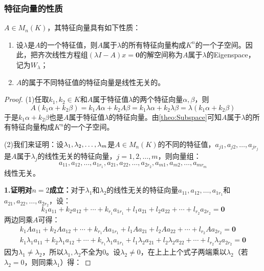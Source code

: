 \subsubsection{特征向量的性质}
\begin{property}\label{prop:Eigenvector}
	$A\in M_{n}(K)$，其特征向量具有如下性质：
	\begin{enumerate}
		\item 设$\lambda$是$A$的一个特征值，则$A$属于$\lambda$的所有特征向量构成$K^n$的一个子空间。因此，把齐次线性方程组$(\lambda I-A)x=\mathbf{0}$的解空间称为$A$属于$\lambda$的\gls{Eigenspace}，记为$W_{\lambda}$；
		\item $A$的属于不同特征值的特征向量是线性无关的。
	\end{enumerate}
\end{property}
\begin{proof}
	(1)任取$k_1,k_2\in K$和$A$属于特征值$\lambda$的两个特征向量$\alpha,\beta$，则
	\begin{equation*}
		A(k_1\alpha+k_2\beta)=k_1A\alpha+k_2A\beta=k_1\lambda\alpha+k_2\lambda\beta=\lambda(k_1\alpha+k_2\beta)
	\end{equation*}
	于是$k_1\alpha+k_2\beta$也是$A$属于特征值$\lambda$的特征向量。由\cref{theo:Subspace}可知$A$属于$\lambda$的所有特征向量构成$K^n$的一个子空间。\par
	(2)我们来证明：设$\lambda_1, \lambda_2, \dots, \lambda_{m}$是$A\in M_{n}(K)$的不同的特征值，$a_{j1},a_{j2},\dots,a_{jr_j}$是$A$属于$\lambda_j$的线性无关的特征向量，$j=1,2,\dots,m$，则向量组：
	\begin{equation*}
		a_{11},a_{12},\dots,a_{1r_1},a_{21},a_{22},\dots,a_{2r_2},a_{m1},a_{m2},\dots,a_{mr_m}
	\end{equation*}
	线性无关。\par
	\textbf{1.证明对$n=2$成立：}对于$\lambda_1$和$\lambda_2$的线性无关的特征向量$a_{11},a_{12},\dots,a_{1r_1}$和$a_{21},a_{22},\dots,a_{2r_2}$，设：
	\begin{equation*}
		k_1a_{11}+k_2a_{12}+\cdots+k_{r_1}a_{1r_1}+l_1a_{21}+l_2a_{22}+\cdots+l_{r_2}a_{2r_2}=\mathbf{0}
	\end{equation*}
	两边同乘$A$可得：
	\begin{gather*}
		k_1Aa_{11}+k_2Aa_{12}+\cdots+k_{r_1}Aa_{1r_1}+l_1Aa_{21}+l_2Aa_{22}+\cdots+l_{r_2}Aa_{2r_2}=\mathbf{0} \\
		k_1\lambda_1a_{11}+k_2\lambda_1a_{12}+\cdots+k_{r_1}\lambda_1a_{1r_1}+l_1\lambda_2a_{21}+l_2\lambda_2a_{22}+\cdots+l_{r_2}\lambda_2a_{2r_2}=\mathbf{0}
	\end{gather*}
	因为$\lambda_1\ne\lambda_2$，所以$\lambda_1,\lambda_2$不全为$0$。设$\lambda_2\ne0$，在上上上个式子两端乘以$\lambda_2$（若$\lambda_2=0$，则同乘$\lambda_1$）得：

\end{proof}
